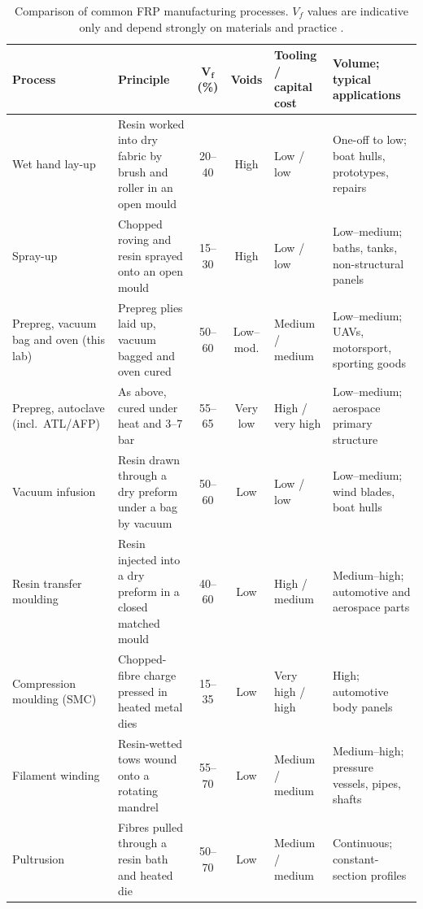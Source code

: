 \documentclass[11pt,a4paper]{article}
\newcommand{\addedfloat}{\color{addgreen}}  %
\newcommand{\addedfloat}{}
\begin{document}
\begin{table}[htbp]
    \addedfloat
    \centering
    \caption{Comparison of common FRP manufacturing processes.
    $V_f$ values are indicative only and depend strongly on materials
    and practice \citep{campbell2004,astrom1997,mallick2007,williams1996}.}
    \label{tab:processes}
    \footnotesize
    \renewcommand{\arraystretch}{1.1}
    \begin{tabularx}{\linewidth}{@{}>{\raggedright\arraybackslash}p{2.6cm}Lcc>{\raggedright\arraybackslash}p{1.7cm}>{\raggedright\arraybackslash}p{3.6cm}@{}}
        \toprule
        \textbf{Process} & \textbf{Principle} & $\boldsymbol{V_f}$ \textbf{(\%)}
        & \textbf{Voids} & \textbf{Tooling / capital cost} & \textbf{Volume; typical applications} \\
        \midrule
        Wet hand lay-up & Resin worked into dry fabric by brush and roller
            in an open mould & 20--40 & High & Low / low
            & One-off to low; boat hulls, prototypes, repairs \\
        Spray-up & Chopped roving and resin sprayed onto an open mould
            & 15--30 & High & Low / low & Low--medium; baths, tanks,
            non-structural panels \\
        Prepreg, vacuum bag and oven (this lab) & Prepreg plies laid up,
            vacuum bagged and oven cured & 50--60 & Low--mod.
            & Medium / medium & Low--medium; UAVs, motorsport, sporting goods \\
        Prepreg, autoclave (incl.\ ATL/AFP) & As above, cured under heat
            and 3--7\,bar & 55--65 & Very low & High / very high
            & Low--medium; aerospace primary structure \\
        Vacuum infusion & Resin drawn through a dry preform under a bag
            by vacuum & 50--60 & Low & Low / low & Low--medium; wind
            blades, boat hulls \\
        Resin transfer moulding & Resin injected into a dry preform in a
            closed matched mould & 40--60 & Low & High / medium
            & Medium--high; automotive and aerospace parts \\
        Compression moulding (SMC) & Chopped-fibre charge pressed in
            heated metal dies & 15--35 & Low & Very high / high
            & High; automotive body panels \\
        Filament winding & Resin-wetted tows wound onto a rotating mandrel
            & 55--70 & Low & Medium / medium & Medium--high; pressure
            vessels, pipes, shafts \\
        Pultrusion & Fibres pulled through a resin bath and heated die
            & 50--70 & Low & Medium / medium & Continuous; constant-section
            profiles \\
        \bottomrule
    \end{tabularx}
\end{table}
\end{document}
